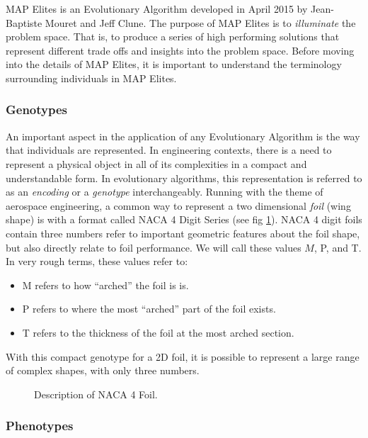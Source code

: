 \documentclass{sig-alternate}
\begin{document}
MAP Elites is an Evolutionary Algorithm developed in April 2015 by Jean-Baptiste Mouret and Jeff Clune.
The purpose of MAP Elites is to \textit{illuminate} the problem space.
That is, to produce a series of high performing solutions that represent different trade offs and insights into the problem space.
Before moving into the details of MAP Elites, it is important to understand the terminology surrounding individuals in MAP Elites.

\subsubsection{Genotypes}
\label{sec:genotypes}

An important aspect in the application of any Evolutionary Algorithm is the way that individuals are represented.
In engineering contexts, there is a need to represent a physical object in all of its complexities in a compact and understandable form.
In evolutionary algorithms, this representation is referred to as an \textit{encoding} or a \textit{genotype} interchangeably.
Running with the theme of aerospace engineering, a common way to represent a two dimensional \textit{foil} (wing shape) is with a format called NACA 4 Digit Series \cite{wiki:NACAairfoil}(see fig \ref{fig:NACA4}).
NACA 4 digit foils contain three numbers refer to important geometric features about the foil shape, but also directly relate to foil performance.
We will call these values $M$, P, and T. In very rough terms, these values refer to:
\begin{itemize}
  \item M refers to how ``arched'' the foil is is.
  \item P refers to where the most ``arched'' part of the foil exists.
  \item T refers to the thickness of the foil at the most arched section.
\end{itemize}
With this compact genotype for a 2D foil, it is possible to represent a large range of complex shapes, with only three numbers.
\begin{figure}[!h]
\centering
{}
\caption{Description of NACA 4 Foil.}
\label{fig:NACA4}
\end{figure}

\subsubsection{Phenotypes}
\label{sec:phenotypes}
\end{document}
